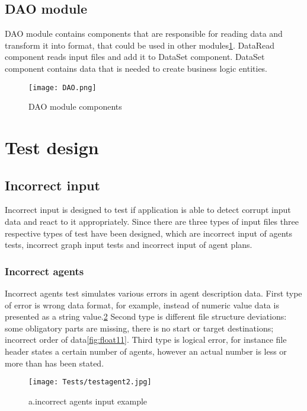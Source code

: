 \documentclass[thesis=B,english]{FITthesis}[2019/12/23]
\begin{document}
\subsection{DAO module}

DAO module contains components that are responsible for reading data and transform it into format, that could be used in other modules\ref{fig:float9}. DataRead component reads input files and add it to DataSet component. DataSet component contains data that is needed to create business logic entities.

\begin{figure}
	\texttt{[image: DAO.png]}
	\caption[DAO module components]{DAO module components}\label{fig:float9}
\end{figure}


\section{Test design}

\subsection{Incorrect input}

Incorrect input is designed to test if application is able to detect corrupt input data and react to it appropriately. Since there are three types of input files three respective types of test have been designed,
which are incorrect input of agents tests, incorrect graph input tests and incorrect input of agent plans. 

\subsubsection{Incorrect agents}

Incorrect agents test simulates various errors in agent description data. First type of error is wrong data format, for example, instead of numeric value data is presented as a string value.\ref{fig:float10} Second type is different file structure deviations: some obligatory parts are missing, there is no start or target destinations; incorrect order of data\ref{fig:float11}. Third type is logical error, for instance file header states a certain number of agents, however an actual number is less or more than has been stated.

\begin{figure}
	\texttt{[image: Tests/testagent2.jpg]}
	\caption[a.incorrect agents input example]{a.incorrect agents input example}\label{fig:float10}
\end{figure}
\end{document}
